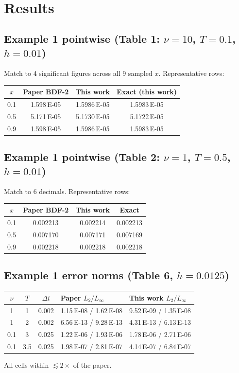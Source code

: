 \documentclass[11pt]{article}
\begin{document}
\section{Results}

\subsection{Example 1 pointwise (Table 1: \(\nu{=}10\), \(T{=}0.1\), \(h{=}0.01\))}
Match to 4 significant figures across all 9 sampled \(x\). Representative rows:
\begin{center}
\begin{tabular}{cccc}
\toprule
\(x\) & Paper BDF-2 & This work & Exact (this work) \\
\midrule
0.1 & 1.598\,E-05 & 1.5986\,E-05 & 1.5983\,E-05 \\
0.5 & 5.171\,E-05 & 5.1730\,E-05 & 5.1722\,E-05 \\
0.9 & 1.598\,E-05 & 1.5986\,E-05 & 1.5983\,E-05 \\
\bottomrule
\end{tabular}
\end{center}

\subsection{Example 1 pointwise (Table 2: \(\nu{=}1\), \(T{=}0.5\), \(h{=}0.01\))}
Match to 6 decimals. Representative rows:
\begin{center}
\begin{tabular}{cccc}
\toprule
\(x\) & Paper BDF-2 & This work & Exact \\
\midrule
0.1 & 0.002213 & 0.002214 & 0.002213 \\
0.5 & 0.007170 & 0.007171 & 0.007169 \\
0.9 & 0.002218 & 0.002218 & 0.002218 \\
\bottomrule
\end{tabular}
\end{center}

\subsection{Example 1 error norms (Table 6, \(h{=}0.0125\))}
\begin{center}
\begin{tabular}{cccll}
\toprule
\(\nu\) & \(T\) & \(\Delta t\) & Paper \(L_2 / L_\infty\) & This work \(L_2 / L_\infty\) \\
\midrule
1   & 1   & 0.002 & 1.15\,E-08 / 1.62\,E-08 & 9.52\,E-09 / 1.35\,E-08 \\
1   & 2   & 0.002 & 6.56\,E-13 / 9.28\,E-13 & 4.31\,E-13 / 6.13\,E-13 \\
0.1 & 3   & 0.025 & 1.22\,E-06 / 1.93\,E-06 & 1.78\,E-06 / 2.71\,E-06 \\
0.1 & 3.5 & 0.025 & 1.98\,E-07 / 2.81\,E-07 & 4.14\,E-07 / 6.84\,E-07 \\
\bottomrule
\end{tabular}
\end{center}
All cells within \(\lesssim 2\times\) of the paper.
\end{document}
